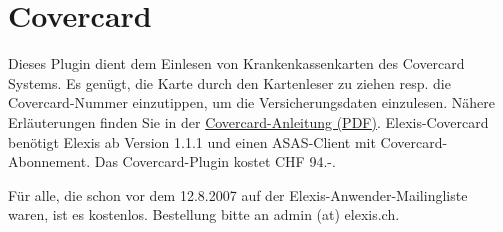 \section{Covercard{\textregistered}}
Dieses Plugin dient dem Einlesen von Krankenkassenkarten des Covercard{\textregistered} Systems. Es genügt, die Karte durch den Kartenleser zu ziehen resp. die Covercard-Nummer einzutippen, um die Versicherungsdaten einzulesen. Nähere Erläuterungen finden Sie in der \href{http://www.elexis.ch/files/covercard.pdf}{Covercard-Anleitung (PDF)}. 
Elexis-Covercard benötigt Elexis ab Version 1.1.1 und einen ASAS-Client mit Covercard-Abonnement.
Das Covercard-Plugin kostet CHF 94.-. 

Für alle, die schon vor dem 12.8.2007 auf der Elexis-Anwender-Mailingliste waren, ist es kostenlos.
Bestellung bitte an admin (at) elexis.ch.